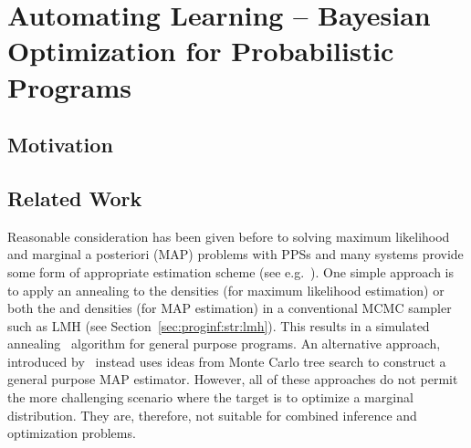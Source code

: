 %

\chapter{Automating Learning -- Bayesian Optimization for Probabilistic Programs}
\label{chp:bopp}



\section{Motivation} 
\label{sec:IntroductionBOPP}



\section{Related Work} 
\label{sec:bopp:related}

Reasonable consideration has been given before to solving maximum likelihood and marginal 
a posteriori (MAP) problems with PPSs and many systems provide some form of appropriate
estimation scheme (see e.g.~\citep{carpenter2015stan,salvatier2016probabilistic}).  One simple
approach is to apply an annealing to the \observe densities (for maximum likelihood estimation)
or both the \sample and \observe densities (for MAP estimation) in
a conventional MCMC sampler such as LMH (see Section~\ref{sec:proginf:str:lmh}).
This results in a simulated annealing~\citep{aarts1988simulated} algorithm for general purpose programs.
An alternative approach, introduced by~\cite{tolpin-socs-2015}
instead uses ideas from Monte Carlo tree search to construct a general purpose MAP estimator.
However, all of these approaches do not permit the more challenging scenario
where the target is to optimize a marginal distribution.  They are, therefore, not suitable for combined
inference and optimization problems.

